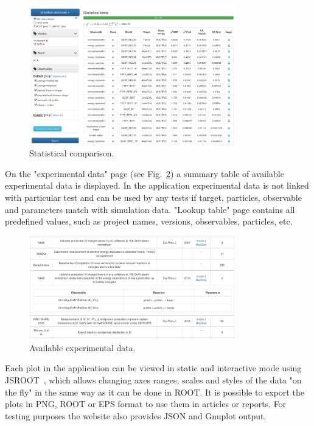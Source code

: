 \begin{figure}[h]
    \centering
    \includegraphics[width=0.8\textwidth,clip]{statcomparison.png}
    \caption{Statistical comparison.}
    \label{fig:statcomparison}
\end{figure}

On the "experimental data" page (see Fig.~\ref{fig:exppage}) a summary table of available experimental data is displayed. In the application experimental data is not linked with particular test and can be used by any tests if target, particles, observable and parameters match with simulation data.
"Lookup table" page contains all predefined values, such as project names, versions, observables, particles, etc.

\begin{figure}[h]
    \centering
    \includegraphics[width=0.8\textwidth,clip]{expdata.png}
    \caption{Available experimental data.}
    \label{fig:exppage}
\end{figure}

Each plot in the application can be viewed in static and interactive mode using JSROOT~\cite{JSROOT}, which allows changing axes ranges, scales and styles of the data "on the fly" in the same way as it can be done in ROOT. It is possible to export the plots in PNG, ROOT or EPS format to use them in articles or reports. For testing purposes the website also provides JSON and Gnuplot output.

